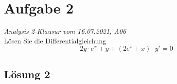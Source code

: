 \documentclass[main.tex]{subfiles}
\begin{document}
\section{Aufgabe 2}
\textit{Analysis 2-Klausur vom 16.07.2021, A06}\\
Lösen Sie die Differentialgleichung
\begin{equation*}
	2y \cdot e^x + y + (2e^x + x) \cdot y' = 0
\end{equation*}

\subsection{Lösung 2}
\end{document}
